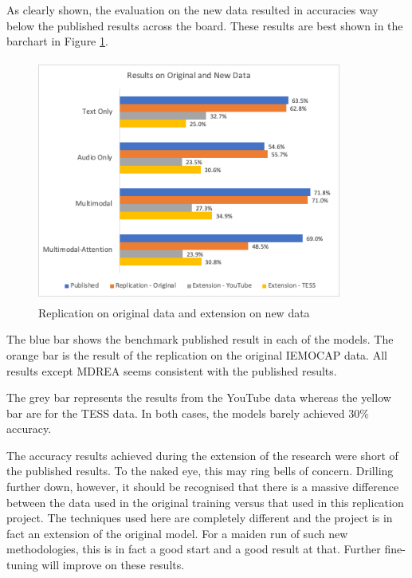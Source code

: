 \documentclass{article}
\begin{document}
    As clearly shown, the evaluation on the new data resulted in accuracies way below the published results across the board. These results are best  shown in the barchart in Figure \ref{fig:barchart_results}.
    
    \begin{figure}[H]
        \centering
        \includegraphics[width=10cm, height=8cm, keepaspectratio]{Images/replication_result.png}
        \caption{Replication on original data and extension on new data}
        \label{fig:barchart_results}
    \end{figure}
    
    The blue bar shows the benchmark published result in each of the models.  The orange bar is the result of the replication on the original IEMOCAP data. All results except MDREA seems consistent with the published results.\par
    
    The grey bar represents the results from the YouTube data whereas the yellow bar are for the TESS data.  In both cases, the models barely achieved 30\% accuracy.\par
    
    The accuracy results achieved during the extension of the research were short of the published results.  To the naked eye, this may ring bells of concern. Drilling further down, however, it should be recognised that there is a massive difference between the data used in the original training versus that used in this replication project. The techniques used here are completely different and the project is in fact an extension of the original model. For a maiden run of such new methodologies, this is in fact a good start and a good result at that.  Further fine-tuning will improve on these results.\par
    
\end{document}
